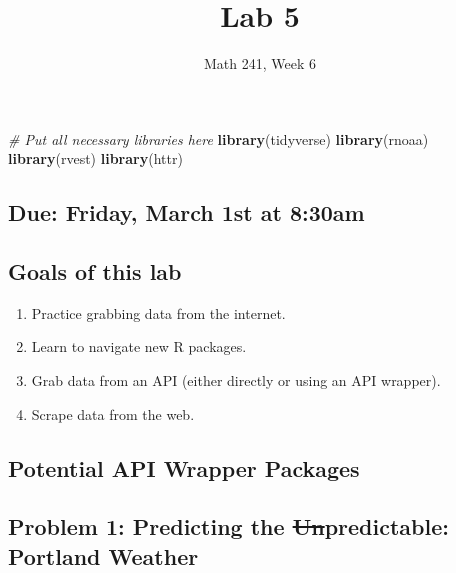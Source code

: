 \documentclass[
]{article}
\title{Lab 5}
\author{}
\date{\vspace{-2.5em}Math 241, Week 6}
\newenvironment{Shaded}{\begin{snugshade}}{\end{snugshade}}
\newcommand{\CommentTok}[1]{\textcolor[rgb]{0.56,0.35,0.01}{\textit{#1}}}
\newcommand{\FunctionTok}[1]{\textcolor[rgb]{0.13,0.29,0.53}{\textbf{#1}}}
\newcommand{\NormalTok}[1]{#1}
\providecommand{\tightlist}{%
  \setlength{\itemsep}{0pt}\setlength{\parskip}{0pt}}
\begin{document}
\maketitle

\begin{Shaded}
\begin{Highlighting}[]
\CommentTok{\# Put all necessary libraries here}
\FunctionTok{library}\NormalTok{(tidyverse)}
\FunctionTok{library}\NormalTok{(rnoaa)}
\FunctionTok{library}\NormalTok{(rvest)}
\FunctionTok{library}\NormalTok{(httr)}
\end{Highlighting}
\end{Shaded}

\hypertarget{due-friday-march-1st-at-830am}{%
\subsection{Due: Friday, March 1st at
8:30am}\label{due-friday-march-1st-at-830am}}

\hypertarget{goals-of-this-lab}{%
\subsection{Goals of this lab}\label{goals-of-this-lab}}

\begin{enumerate}
\def\labelenumi{\arabic{enumi}.}
\tightlist
\item
  Practice grabbing data from the internet.
\item
  Learn to navigate new R packages.
\item
  Grab data from an API (either directly or using an API wrapper).
\item
  Scrape data from the web.
\end{enumerate}

\hypertarget{potential-api-wrapper-packages}{%
\subsection{Potential API Wrapper
Packages}\label{potential-api-wrapper-packages}}

\hypertarget{problem-1-predicting-the-unpredictable-portland-weather}{%
\subsection{\texorpdfstring{Problem 1: Predicting the
\st{Un}predictable: Portland
Weather}{Problem 1: Predicting the Unpredictable: Portland Weather}}\label{problem-1-predicting-the-unpredictable-portland-weather}}
\end{document}
